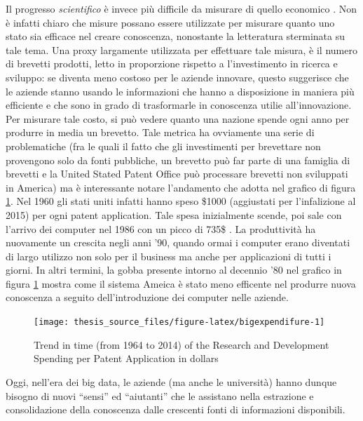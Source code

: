 \documentclass[]{book}
\begin{document}
Il progresso \emph{scientifico} è invece più difficile da misurare di
quello economico
\citep{hirsch2005index, hauschildt1991towards, van2000evaluation, erno2011measuring, bornmann2013societal, bornmann2014evaluate, bornmann2017does}.
Non è infatti chiaro che misure possano essere utilizzate per misurare
quanto uno stato sia efficace nel creare conoscenza, nonostante la
letteratura sterminata su tale tema. Una proxy largamente utilizzata per
effettuare tale misura, è il numero di brevetti prodotti, letto in
proporzione rispetto a l'investimento in ricerca e sviluppo: se diventa
meno costoso per le aziende innovare, questo suggerisce che le aziende
stanno usando le informazioni che hanno a disposizione in maniera più
efficiente e che sono in grado di trasformarle in conoscenza utilie
all'innovazione. Per misurare tale costo, si può vedere quanto una
nazione spende ogni anno per produrre in media un brevetto. Tale metrica
ha ovviamente una serie di problematiche (fra le quali il fatto che gli
investimenti per brevettare non provengono solo da fonti pubbliche, un
brevetto può far parte di una famiglia di brevetti e la United Stated
Patent Office può processare brevetti non sviluppati in America) ma è
interessante notare l'andamento che adotta nel grafico di figura
\ref{fig:bigexpendifure}. Nel 1960 gli stati uniti infatti hanno speso
\$1000 (aggiustati per l'infalizione al 2015) per ogni patent
application. Tale spesa inizialmente scende, poi sale con l'arrivo dei
computer nel 1986 con un picco di 735\$ \citep{silver2012signal}. La
produttività ha nuovamente un crescita negli anni '90, quando ormai i
computer erano diventati di largo utilizzo non solo per il business ma
anche per applicazioni di tutti i giorni. In altri termini, la gobba
presente intorno al decennio '80 nel grafico in figura
\ref{fig:bigexpendifure} mostra come il sistema Ameica è stato meno
efficente nel produrre nuova conoscenza a seguito dell'introduzione dei
computer nelle aziende.

\begin{figure}

{\centering \texttt{[image: thesis\_source\_files/figure-latex/bigexpendifure-1]} 

}

\caption{Trend in time (from 1964 to 2014) of the Research and Development Spending per Patent Application in dollars}\label{fig:bigexpendifure}
\end{figure}

Oggi, nell'era dei big data, le aziende (ma anche le università) hanno
dunque bisogno di nuovi ``sensi'' ed ``aiutanti'' che le assistano nella
estrazione e consolidazione della conoscenza dalle crescenti fonti di
informazioni disponibili.
\end{document}
